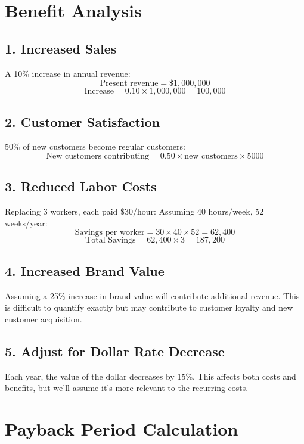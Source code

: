 \documentclass{scrreprt}
\begin{document}
\section*{Benefit Analysis}

\subsection*{1. Increased Sales}
A 10\% increase in annual revenue:
\[
\text{Present revenue} = \$1{,}000{,}000
\]
\[
\text{Increase} = 0.10 \times 1{,}000{,}000 = 100{,}000
\]

\subsection*{2. Customer Satisfaction}
50\% of new customers become regular customers:
\[
\text{New customers contributing} = 0.50 \times \text{new customers} \times 5000
\]

\subsection*{3. Reduced Labor Costs}
Replacing 3 workers, each paid \$30/hour:
Assuming 40 hours/week, 52 weeks/year:
\[
\text{Savings per worker} = 30 \times 40 \times 52 = 62{,}400
\]
\[
\text{Total Savings} = 62{,}400 \times 3 = 187{,}200
\]

\subsection*{4. Increased Brand Value}
Assuming a 25\% increase in brand value will contribute additional revenue. This is difficult to quantify exactly but may contribute to customer loyalty and new customer acquisition.

\subsection*{5. Adjust for Dollar Rate Decrease}
Each year, the value of the dollar decreases by 15\%. This affects both costs and benefits, but we'll assume it's more relevant to the recurring costs.

\section*{Payback Period Calculation}
\end{document}
